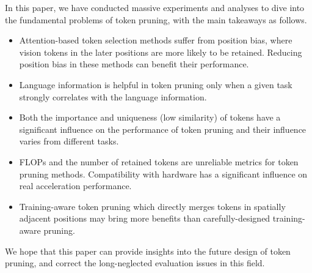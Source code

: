 In this paper, we have conducted massive experiments and analyses to dive into the fundamental problems of token pruning, with the main takeaways as follows.
\begin{itemize}[leftmargin=10pt, topsep=0pt, itemsep=1pt, partopsep=1pt, parsep=1pt]
    \item Attention-based token selection methods suffer from position bias, where vision tokens in the later positions are more likely to be retained. Reducing position bias in these methods can benefit their performance.
    \item Language information is helpful in token pruning only when a given task strongly correlates with the language information.
    \item Both the importance and uniqueness (low similarity) of tokens
    have a significant influence on the performance of token pruning and their influence varies from different tasks.
    \item FLOPs and the number of retained tokens are unreliable metrics for token pruning methods. Compatibility with hardware has a significant influence on real acceleration performance.
    \item Training-aware token pruning which directly merges tokens in spatially adjacent positions may bring more benefits than carefully-designed training-aware pruning.
\end{itemize}

% 

We hope that this paper can provide insights into the future design of token pruning, and correct the long-neglected evaluation issues in this field.


